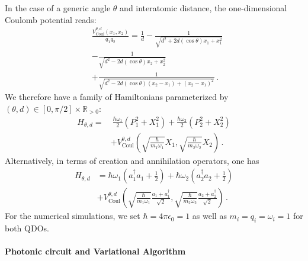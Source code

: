 \documentclass[reprint, amsmath, amssymb, aps, pra]{revtex4-2}
\begin{document}
        In the case of a generic angle $\theta$ and interatomic distance, the one-dimensional Coulomb potential reads:
        \begin{equation}
        \begin{split}
            &\frac{V_\text{Coul}^{\theta, d}(x_1, x_2)}{q_1q_2} = \frac{1}{d} - \frac{1}{\sqrt{d^2+2d(\cos\theta) x_1+x_1^2}} \\
            &- \frac{1}{\sqrt{d^2-2d(\cos\theta) x_2+x_2^2}} \\
            &+\frac{1}{\sqrt{d^2 - 2d(\cos\theta) (x_2-x_1) + (x_2-x_1)^2}}\,.
        \end{split}
        \end{equation}
        We therefore have a family of Hamiltonians parameterized by $(\theta, d)\in[0, \pi/2]\times\mathbb R_{>0}$:
        \begin{equation}
        \label{eq:finalHamiltonian}
        \begin{split}
            H_{\theta, d}=&\ \frac{\hbar\omega_1}{2}\left(P_1^2 + X_1^2\right) + \frac{\hbar\omega_2}{2}\left(P_2^2 + X_2^2\right)\\
            &+V_\text{Coul}^{\theta, d}\left(\sqrt{\frac{\hbar}{m_1\omega_1}}X_1, \sqrt{\frac{\hbar}{m_2\omega_2}}X_2\right)\,.
        \end{split}
        \end{equation}
        Alternatively, in terms of creation and annihilation operators, one has
        \begin{equation}
        \label{eq:Hamiltonian_heterodyne}
        \begin{split}
            H_{\theta, d} &= \hbar\omega_1\left( a_{1}^\dagger a_{1} +\frac{1}{2}\right) + \hbar\omega_2\left(a_{2}^\dagger a_{2} +\frac{1}{2}\right) \\
            & + V_\text{Coul}^{\theta, d}\left(\sqrt{\frac{\hbar}{m_1\omega_1}}\frac{a_1 + a_1^\dagger}{\sqrt 2}, \sqrt{\frac{\hbar}{m_2\omega_2}}\frac{a_2 + a_2^\dagger}{\sqrt 2}\right)\,.
        \end{split}
        \end{equation}
        For the numerical simulations, we set $\hbar=4\pi\epsilon_0=1$ as well as $m_i=q_i=\omega_i=1$ for both QDOs.
\newline
\paragraph*{Photonic circuit and Variational Algorithm}
\end{document}

